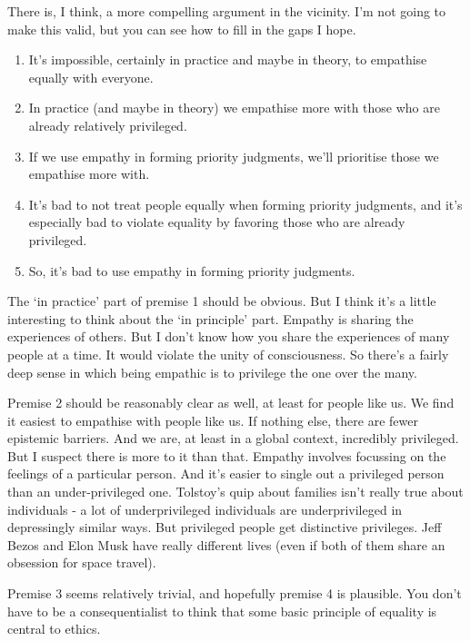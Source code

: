 \documentclass[
]{article}
\providecommand{\tightlist}{%
  \setlength{\itemsep}{0pt}\setlength{\parskip}{0pt}}
\begin{document}
There is, I think, a more compelling argument in the vicinity. I'm not
going to make this valid, but you can see how to fill in the gaps I
hope.

\begin{enumerate}
\def\labelenumi{\arabic{enumi}.}
\tightlist
\item
  It's impossible, certainly in practice and maybe in theory, to
  empathise equally with everyone.
\item
  In practice (and maybe in theory) we empathise more with those who are
  already relatively privileged.
\item
  If we use empathy in forming priority judgments, we'll prioritise
  those we empathise more with.
\item
  It's bad to not treat people equally when forming priority judgments,
  and it's especially bad to violate equality by favoring those who are
  already privileged.
\item
  So, it's bad to use empathy in forming priority judgments.
\end{enumerate}

The `in practice' part of premise 1 should be obvious. But I think it's
a little interesting to think about the `in principle' part. Empathy is
sharing the experiences of others. But I don't know how you share the
experiences of many people at a time. It would violate the unity of
consciousness. So there's a fairly deep sense in which being empathic is
to privilege the one over the many.

Premise 2 should be reasonably clear as well, at least for people like
us. We find it easiest to empathise with people like us. If nothing
else, there are fewer epistemic barriers. And we are, at least in a
global context, incredibly privileged. But I suspect there is more to it
than that. Empathy involves focussing on the feelings of a particular
person. And it's easier to single out a privileged person than an
under-privileged one. Tolstoy's quip about families isn't really true
about individuals - a lot of underprivileged individuals are
underprivileged in depressingly similar ways. But privileged people get
distinctive privileges. Jeff Bezos and Elon Musk have really different
lives (even if both of them share an obsession for space travel).

Premise 3 seems relatively trivial, and hopefully premise 4 is
plausible. You don't have to be a consequentialist to think that some
basic principle of equality is central to ethics.
\end{document}
